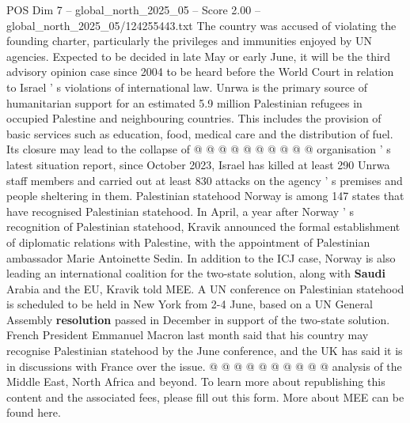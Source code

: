 \begin{textsample}{POS Dim 7 – global\_north\_2025\_05 – Score 2.00 – global\_north\_2025\_05/124255443.txt}
The country was accused of violating the founding charter, particularly the privileges and immunities enjoyed by UN agencies.
Expected to be decided in late May or early June, it will be the third advisory opinion case since 2004 to be heard before the World Court in relation to Israel ' s violations of international law.
Unrwa is the primary source of humanitarian support for an estimated 5.9 million Palestinian refugees in occupied Palestine and neighbouring countries.
This includes the provision of basic services such as education, food, medical care and the distribution of fuel.
Its closure may lead to the collapse of @ @ @ @ @ @ @ @ @ @ organisation ' s latest situation report, since October 2023, Israel has killed at least 290 Unrwa staff members and carried out at least 830 attacks on the agency ' s premises and people sheltering in them.
Palestinian statehood Norway is among 147 states that have recognised Palestinian statehood.
In April, a year after Norway ' s recognition of Palestinian statehood, Kravik announced the formal establishment of diplomatic relations with Palestine, with the appointment of Palestinian ambassador Marie Antoinette Sedin.
In addition to the ICJ case, Norway is also leading an international coalition for the two-state solution, along with \textbf{Saudi} Arabia and the EU, Kravik told MEE.
A UN conference on Palestinian statehood is scheduled to be held in New York from 2-4 June, based on a UN General Assembly \textbf{resolution} passed in December in support of the two-state solution.
French President Emmanuel Macron last month said that his country may recognise Palestinian statehood by the June conference, and the UK has said it is in discussions with France over the issue. @ @ @ @ @ @ @ @ @ @ analysis of the Middle East, North Africa and beyond.
To learn more about republishing this content and the associated fees, please fill out this form.
More about MEE can be found here.

\end{textsample}
